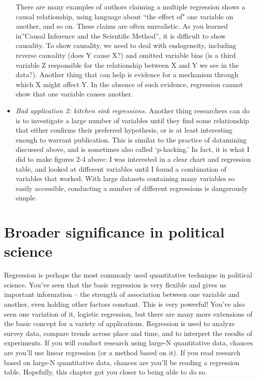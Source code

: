 \documentclass{book}
\begin{document}
\begin{itemize}
  There are many examples of authors claiming a multiple regression shows a
  causal relationship, using language about ``the effect of" one variable on
  another, and so on. These claims are often unrealistic. As you learned
  in''Causal Inference and the Scientific Method'', it is difficult to show
  causality. To show causality, we need to deal with endogeneity, including
  reverse causality (does Y cause X?) and omitted variable bias (is a third
  variable Z responsible for the relationship between X and Y we see in the
  data?). Another thing that can help is evidence for a mechanism through
  which X might affect Y. In the absence of such evidence, regression cannot
  show that one variable causes another.
\item
  \emph{Bad application 2: kitchen sink regressions.} Another thing
  researchers can do is to investigate a large number of variables until they
  find some relationship that either confirms their preferred hypothesis, or
  is at least interesting enough to warrant publication. This is similar to
  the practice of datamining discussed above, and is sometimes also called
  `p-hacking.' In fact, it is what I did to make figures 2-4 above: I was
  interested in a clear chart and regression table, and looked at different
  variables until I found a combination of variables that worked. With large
  datasets containing many variables so easily accessible, conducting a number
  of different regressions is dangerously simple.
\end{itemize}

\hypertarget{broader-significance-in-political-science}{%
\section{Broader significance in political
science}\label{broader-significance-in-political-science}}

Regression is perhaps the most commonly used quantitative technique in
political science. You've seen that the basic regression is very flexible and
gives us important information -- the strength of association between one
variable and another, even holding other factors constant. This is very
powerful! You've also seen one variation of it, logistic regression, but there
are many more extensions of the basic concept for a variety of applications.
Regression is used to analyze survey data, compare trends across place and
time, and to interpret the results of experiments. If you will conduct
research using large-N quantitative data, chances are you'll use linear
regression (or a method based on it). If you read research based on large-N
quantitative data, chances are you'll be reading a regression table.
Hopefully, this chapter got you closer to being able to do so.
\end{document}
